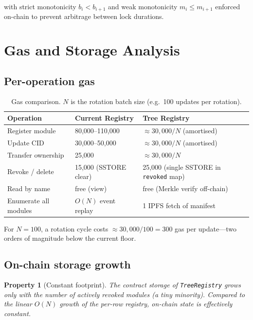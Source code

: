 \documentclass[11pt,a4paper]{article}
\newtheorem{property}{Property}[section]
\begin{document}
with strict monotonicity $b_i < b_{i+1}$ and weak monotonicity $m_i \leq m_{i+1}$ enforced on-chain to prevent arbitrage between lock durations.

\section{Gas and Storage Analysis}

\subsection{Per-operation gas}

\begin{table}[H]
\centering
\begin{tabularx}{\textwidth}{lXX}
\toprule
\textbf{Operation} & \textbf{Current Registry} & \textbf{Tree Registry} \\
\midrule
Register module          & 80{,}000--110{,}000 & $\approx 30{,}000 / N$ (amortised) \\
Update CID               & 30{,}000--50{,}000 & $\approx 30{,}000 / N$ (amortised) \\
Transfer ownership       & 25{,}000 & $\approx 30{,}000 / N$ \\
Revoke / delete          & 15{,}000 (SSTORE clear) & 25{,}000 (single SSTORE in \texttt{revoked} map) \\
Read by name             & free (view) & free (Merkle verify off-chain) \\
Enumerate all modules    & $O(N)$ event replay & 1 IPFS fetch of manifest \\
\bottomrule
\end{tabularx}
\caption{Gas comparison. $N$ is the rotation batch size (e.g.\ 100 updates per rotation).}
\end{table}

For $N = 100$, a rotation cycle costs $\approx 30{,}000 / 100 = 300$ gas per update---two orders of magnitude below the current floor.

\subsection{On-chain storage growth}

\begin{property}[Constant footprint]
The contract storage of \texttt{TreeRegistry} grows only with the number of actively revoked modules (a tiny minority). Compared to the linear $O(N)$ growth of the per-row registry, on-chain state is effectively constant.
\end{property}
\end{document}
